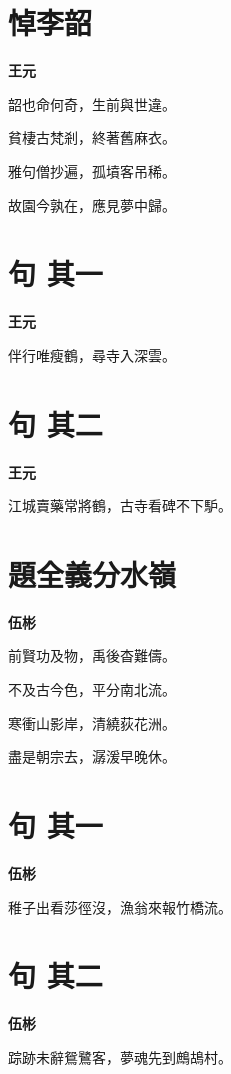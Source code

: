 \documentclass[12pt,a4paper]{ctexbook}
\begin{document}
\section{悼李韶}
\textbf{王元}\par\vspace{0.5em}
韶也命何奇，生前與世違。\par
貧棲古梵剎，終著舊麻衣。\par
雅句僧抄遍，孤墳客吊稀。\par
故園今孰在，應見夢中歸。\par

\section{句  其一}
\textbf{王元}\par\vspace{0.5em}
伴行唯瘦鶴，尋寺入深雲。\par

\section{句  其二}
\textbf{王元}\par\vspace{0.5em}
江城賣藥常將鶴，古寺看碑不下馿。\par

\section{題全義分水嶺}
\textbf{伍彬}\par\vspace{0.5em}
前賢功及物，禹後杳難儔。\par
不及古今色，平分南北流。\par
寒衝山影岸，清繞荻花洲。\par
盡是朝宗去，潺湲早晚休。\par

\section{句  其一}
\textbf{伍彬}\par\vspace{0.5em}
稚子出看莎徑沒，漁翁來報竹橋流。\par

\section{句  其二}
\textbf{伍彬}\par\vspace{0.5em}
踪跡未辭鴛鷺客，夢魂先到鷓鴣村。\par
\end{document}
